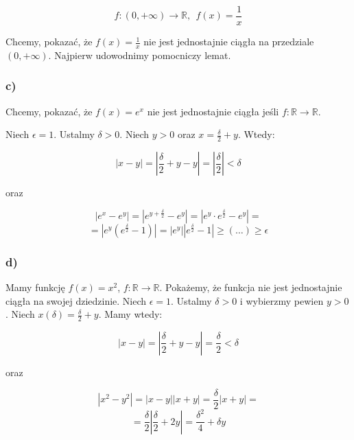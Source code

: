 \documentclass{article}
\begin{document}
\begin{equation*}
    f : (0, + \infty) \rightarrow \mathbb{R}, \ \ f(x) = \frac{1}{x}
\end{equation*}

Chcemy, pokazać, że \(f(x) = \frac{1}{x}\) nie jest jednostajnie ciągła na przedziale \((0, + \infty)\). Najpierw udowodnimy pomocniczy lemat.

\subsubsection*{c)}

Chcemy, pokazać, że \(f(x) = e^{x}\) nie jest jednostajnie ciągła jeśli \(f: \mathbb{R} \rightarrow \mathbb{R}\).


Niech \(\epsilon = 1\). Ustalmy \(\delta > 0\). Niech \(y > 0\) oraz
\(x = \frac{\delta}{2} + y\). Wtedy:

\begin{equation*}
    |x - y| = |\frac{\delta}{2} + y - y| = |\frac{\delta}{2}| < \delta
\end{equation*}

oraz

\begin{equation*}
    |e^{x} - e^{y}| = |e^{y + \frac{\delta}{2}} - e^y| = |e^{y} \cdot e^{\frac{\delta}{2}} - e^{y}| =
\end{equation*}
\begin{equation*}
    = |e^{y} (e^{\frac{\delta}{2}} - 1)| = |e^{y}| |e^{\frac{\delta}{2}} - 1| \geq (\dots) \geq \epsilon
\end{equation*}

\subsubsection*{d)}

Mamy funkcję \(f(x) = x^2\), \(f: \mathbb{R} \rightarrow \mathbb{R}\). Pokażemy, że funkcja nie jest
jednostajnie ciągła na swojej dziedzinie. Niech \(\epsilon = 1\). Ustalmy \(\delta > 0\) i wybierzmy pewien \(y > 0\). Niech
\(x(\delta) = \frac{\delta}{2} + y\). Mamy wtedy:

\begin{equation*}
    |x - y| = |\frac{\delta}{2} + y - y| = \frac{\delta}{2} < \delta
\end{equation*}

oraz

\begin{equation*}
    |x^{2} - y^{2}| = |x - y||x + y| =  \frac{\delta}{2} |x + y| = 
\end{equation*}
\begin{equation*}
    = \frac{\delta}{2} |\frac{\delta}{2} + 2y| = \frac{\delta^{2}}{4} + \delta y
\end{equation*}
\end{document}
